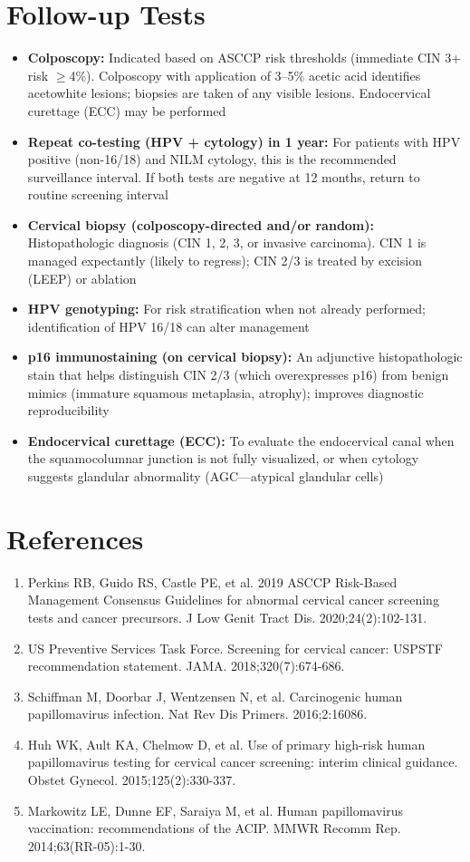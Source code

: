 \section*{Follow-up Tests}
\begin{itemize}
  \item \textbf{Colposcopy:} Indicated based on ASCCP risk thresholds (immediate CIN 3+ risk $\geq$4\%). Colposcopy with application of 3--5\% acetic acid identifies acetowhite lesions; biopsies are taken of any visible lesions. Endocervical curettage (ECC) may be performed
  \item \textbf{Repeat co-testing (HPV + cytology) in 1 year:} For patients with HPV positive (non-16/18) and NILM cytology, this is the recommended surveillance interval. If both tests are negative at 12 months, return to routine screening interval
  \item \textbf{Cervical biopsy (colposcopy-directed and/or random):} Histopathologic diagnosis (CIN 1, 2, 3, or invasive carcinoma). CIN 1 is managed expectantly (likely to regress); CIN 2/3 is treated by excision (LEEP) or ablation
  \item \textbf{HPV genotyping:} For risk stratification when not already performed; identification of HPV 16/18 can alter management
  \item \textbf{p16 immunostaining (on cervical biopsy):} An adjunctive histopathologic stain that helps distinguish CIN 2/3 (which overexpresses p16) from benign mimics (immature squamous metaplasia, atrophy); improves diagnostic reproducibility
  \item \textbf{Endocervical curettage (ECC):} To evaluate the endocervical canal when the squamocolumnar junction is not fully visualized, or when cytology suggests glandular abnormality (AGC---atypical glandular cells)
\end{itemize}

\section*{References}
\begin{enumerate}
  \item Perkins RB, Guido RS, Castle PE, et al. 2019 ASCCP Risk-Based Management Consensus Guidelines for abnormal cervical cancer screening tests and cancer precursors. J Low Genit Tract Dis. 2020;24(2):102-131.
  \item US Preventive Services Task Force. Screening for cervical cancer: USPSTF recommendation statement. JAMA. 2018;320(7):674-686.
  \item Schiffman M, Doorbar J, Wentzensen N, et al. Carcinogenic human papillomavirus infection. Nat Rev Dis Primers. 2016;2:16086.
  \item Huh WK, Ault KA, Chelmow D, et al. Use of primary high-risk human papillomavirus testing for cervical cancer screening: interim clinical guidance. Obstet Gynecol. 2015;125(2):330-337.
  \item Markowitz LE, Dunne EF, Saraiya M, et al. Human papillomavirus vaccination: recommendations of the ACIP. MMWR Recomm Rep. 2014;63(RR-05):1-30.
\end{enumerate}

\clearpage
